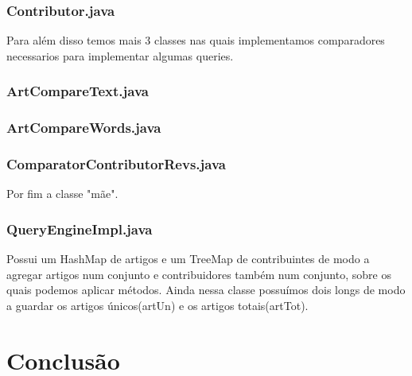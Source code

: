 \documentclass[a4paper,12pt,portuguese]{report}
\begin{document}
\subsection{Contributor.java}


Para além disso temos mais 3 classes nas quais implementamos comparadores necessarios para implementar algumas queries. 

\subsection{ArtCompareText.java}

\subsection{ArtCompareWords.java}

\subsection{ComparatorContributorRevs.java}

Por fim a classe "mãe". 

\subsection{QueryEngineImpl.java}
Possui um HashMap de artigos e um TreeMap de contribuintes de modo a agregar artigos num conjunto e contribuidores também num conjunto, sobre os quais podemos aplicar métodos. Ainda nessa classe possuímos dois longs de modo a guardar os artigos únicos(artUn) e os artigos totais(artTot).

\chapter{Conclusão}
\end{document}

